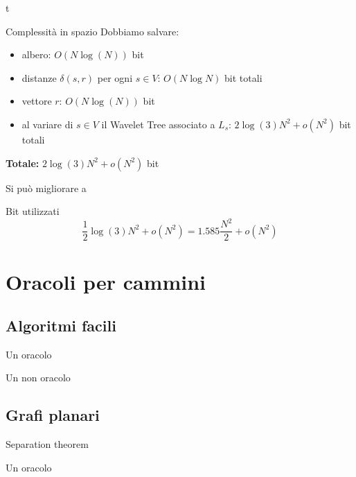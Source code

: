 t \documentclass{beamer}
\theoremstyle{plain}
\theoremstyle{definition}
\theoremstyle{remark}
\newcommand{\pa}[1]{\left(#1\right)}
\begin{document}
\begin{frame}{Complessità in spazio}
  Dobbiamo salvare:
  \begin{itemize}
  \item albero: $O\pa{N\log\pa{N}}$ bit
  \item distanze $\delta\pa{s,r}$ per ogni $s\in V$: $O\pa{ N \log N}$
    bit totali
  \item vettore $r$: $O\pa{N \log\pa{N}}$ bit 
  \item al variare di $s\in V$ il Wavelet Tree associato a $L_s$:
    $2\log\pa{3} N^2 + o(N^2)$ bit totali
  \end{itemize}
  \textbf{Totale:} ${2}\log\pa{3} N^2 + o(N^2)$ bit
  \vfill
  \pause

  Si pu\`o migliorare a 
  \begin{block}{Bit utilizzati}
    \[ \frac{1}{2}\log\pa{3} N^2 + o\pa{N^2} = 1.585 \frac{N^2}{2} +
    o\pa{N^2} \]
  \end{block}
\end{frame}


\section{Oracoli per cammini}

\subsection{Algoritmi facili}

\begin{frame}{Un oracolo}
  
\end{frame}

\begin{frame}{Un non oracolo}
  
\end{frame}

\subsection{Grafi planari}

\begin{frame}{Separation theorem}
  
\end{frame}

\begin{frame}{Un oracolo}
  
\end{frame}
\end{document}
